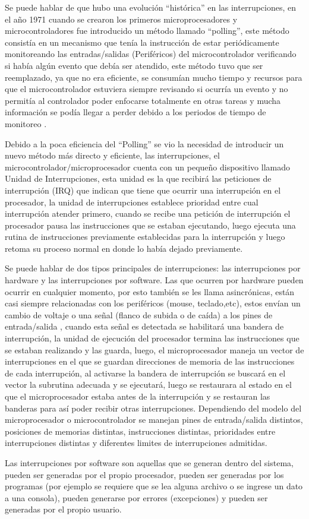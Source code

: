 \documentclass[11pt]{article}
\begin{document}
Se puede hablar de que hubo una evolución “histórica” en las interrupciones, en el año 1971 cuando se crearon los primeros microprocesadores y microcontroladores fue introducido un método llamado “polling”, este método consistía en un mecanismo que tenía la instrucción de estar periódicamente monitoreando las entradas/salidas (Periféricos) del microcontrolador verificando si había algún evento que debía ser atendido, este método tuvo que ser reemplazado, ya que no era eficiente, se consumían mucho tiempo y recursos para que el microcontrolador estuviera siempre revisando si ocurría un evento y no permitía al controlador poder enfocarse totalmente en otras tareas y mucha información se podía llegar a perder debido a los periodos de tiempo de monitoreo \cite{reyes2015arduino}.

Debido a la poca eficiencia del “Polling” se vio la necesidad de introducir un nuevo método más directo y eficiente, las interrupciones, el microcontrolador/microprocesador cuenta con un pequeño dispositivo llamado Unidad de Interrupciones, esta unidad es la que recibirá las peticiones de interrupción (IRQ) que indican que tiene que ocurrir una interrupción en el procesador, la unidad de interrupciones establece prioridad entre cual interrupción atender primero, cuando se recibe una petición de interrupción el procesador pausa las instrucciones que se estaban ejecutando, luego ejecuta una rutina de instrucciones previamente establecidas para la interrupción y luego retoma su proceso normal en donde lo había dejado previamente\cite{reyes2015arduino}.

Se puede hablar de dos tipos principales de interrupciones: las interrupciones por hardware y las interrupciones por software. Las que ocurren por hardware pueden ocurrir en cualquier momento, por esto también se les llama asincrónicas, están casi siempre relacionadas con  los periféricos (mouse, teclado,etc), estos envían un cambio de voltaje o una señal (flanco de subida o de caída) a los pines de entrada/salida , cuando esta señal es detectada se habilitará una bandera de interrupción, la unidad de ejecución del procesador termina las instrucciones que se estaban realizando y las guarda, luego, el microprocesador maneja un vector de interrupciones en el que se  guardan direcciones de memoria de las instrucciones de cada interrupción, al activarse la bandera de interrupción se buscará en el vector  la subrutina adecuada y se ejecutará, luego se restaurara al estado en el que el microprocesador estaba antes de la interrupción y se restauran las banderas para así poder recibir otras interrupciones. Dependiendo del modelo del microprocesador o microcontrolador se manejan pines de entrada/salida distintos, posiciones de memorias distintas, instrucciones distintas, prioridades entre interrupciones distintas y diferentes limites de interrupciones admitidas.

Las interrupciones por software son aquellas que se generan dentro del sistema, pueden ser generadas por el propio procesador, pueden ser generadas por los programas (por ejemplo se requiere que se lea alguna archivo o se ingrese un dato a una consola), pueden generarse por errores (excepciones) y pueden ser generadas por el propio usuario.
 

\medskip
 
\end{document}
